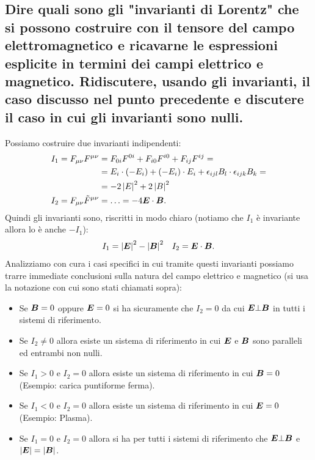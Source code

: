 \subsection[]{Dire quali sono gli "invarianti di Lorentz" che si possono costruire con il tensore del campo elettromagnetico e ricavarne le espressioni esplicite in termini dei campi elettrico e magnetico. Ridiscutere, usando gli invarianti, il caso discusso nel punto precedente e discutere il caso in cui gli invarianti sono nulli.}
\label{sec:3.b.5}
Possiamo costruire due invarianti indipendenti:
\begin{align*}
	I_{1}=F_{\mu\nu}F^{\mu\nu}&=F_{0i}F^{0i}+F_{i 0}F^{i 0} + F_{ij}F^{ij}=\\ 
	&= E_{i}\cdot \left( -E_{i} \right)+\left( -E_{i}\right)\cdot E_{i} + \epsilon_{ijl}B_{l}\cdot \epsilon_{ijk}B_{k}=\\
	&=-2\left| E \right|^2 + 2\left|B\right|^2\\
	I_2=F_{\mu\nu}\tilde{F}^{\mu\nu}&=\ldots=-4 \boldsymbol{E}\cdot \boldsymbol{B}
.\end{align*}
Quindi gli invarianti sono, riscritti in modo chiaro (notiamo che $I_1$ è invariante allora lo è anche $-I_1$):
\begin{align*}
	&I_1 =\left| \boldsymbol{E} \right|^2- \left| \boldsymbol{B} \right| ^2 
	&I_2 = \boldsymbol{E}\cdot \boldsymbol{B}
.\end{align*}
Analizziamo con cura i casi specifici in cui tramite questi invarianti possiamo trarre immediate conclusioni sulla natura del campo elettrico e magnetico (si usa la notazione con cui sono stati chiamati sopra):
\begin{itemize}
	\item Se $\boldsymbol{B}=0$ oppure $\boldsymbol{E}=0$ si ha sicuramente che $I_2=0$ da cui $\boldsymbol{E} \bot \boldsymbol{B}$ in tutti i sistemi di riferimento.
	\item Se $I_2\neq 0$ allora esiste un sistema di riferimento in cui $\boldsymbol{E}$ e $\boldsymbol{B}$ sono paralleli ed entrambi non nulli.
	\item Se $I_1 > 0$ e $I_2 = 0$ allora esiste un sistema di riferimento in cui $\boldsymbol{B}=0$ (Esempio: carica puntiforme ferma). 
	\item Se $I_1<0$ e $I_2=0$ allora esiste un sistema di riferimento in cui $\boldsymbol{E}=0$ (Esempio: Plasma).
	\item Se $I_1=0$ e $I_2=0$ allora si ha per tutti i sistemi di riferimento che $\boldsymbol{E} \bot \boldsymbol{B}$ e $\left| \boldsymbol{E} \right| = \left| \boldsymbol{B} \right| $.
\end{itemize}



